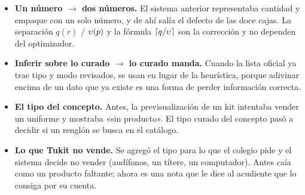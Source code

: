\begin{evolucion}[: normalización]
\begin{itemize}
  \item \textbf{Un número $\to$ dos números.} El sistema anterior representaba
        cantidad y empaque con un solo número, y de ahí salía el defecto de las
        doce cajas. La separación $q(r)$ / $\upsilon(p)$ y la fórmula
        $\left\lceil q/\upsilon \right\rceil$ son la corrección y no dependen del optimizador.
  \item \textbf{Inferir sobre lo curado $\to$ lo curado manda.} Cuando la lista
        oficial ya trae tipo y modo revisados, se usan en lugar de la
        heurística, porque adivinar encima de un dato que ya existe es una
        forma de perder información correcta.
  \item \textbf{El tipo del concepto.} Antes, la previsualización de un kit
        intentaba vender un uniforme y mostraba «sin producto». El tipo curado
        del concepto pasó a decidir si un renglón se busca en el catálogo.
  \item \textbf{Lo que Tukit no vende.} Se agregó el tipo  para lo
        que el colegio pide y el sistema decide no vender (audífonos, un
        títere, un computador). Antes caía como un producto faltante; ahora
        es una nota que le dice al acudiente que lo consiga por su cuenta.
\end{itemize}
\end{evolucion}
